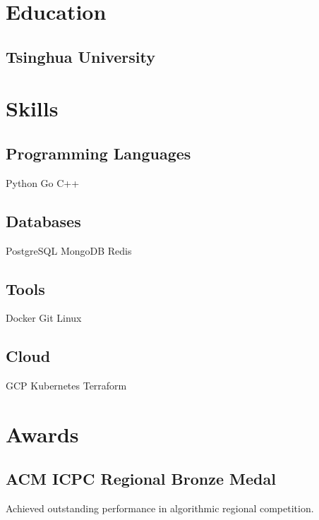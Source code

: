 \documentclass[]{plushcv}
\begin{document}
\begin{paracol}{2}
\switchcolumn


\section{Education} 
\subsection{Tsinghua University }
\sectionsep


\section{Skills}
\subsection{Programming Languages}
Python \textbullet{}  Go \textbullet{}  C++  \\   \sectionsep \subsection{Databases}
PostgreSQL \textbullet{}  MongoDB \textbullet{}  Redis  \\   \sectionsep \subsection{Tools}
Docker \textbullet{}  Git \textbullet{}  Linux  \\   \sectionsep \subsection{Cloud}
GCP \textbullet{}  Kubernetes \textbullet{}  Terraform  \\   \sectionsep \sectionsep
\newline

\section{Awards} 
\subsection{ACM ICPC Regional Bronze Medal}
Achieved outstanding performance in algorithmic regional competition.
\sectionsep


\end{paracol} 
\end{document}
